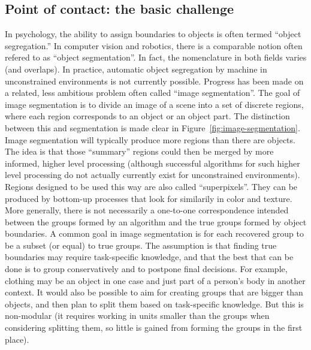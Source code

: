 
\subsection{Point of contact: the basic challenge}

In psychology, the ability to assign boundaries to objects is 
often termed
``object segregation.''  In computer vision and robotics, there
is a comparable notion often refered to as ``object segmentation''.
In fact, the nomenclature in both fields varies (and overlaps).
%
In practice, automatic object segregation by machine
in unconstrained environments is not currently possible.
%
Progress has been made on a related, less ambitious problem
often called ``image segmentation''.  The goal of image segmentation
is to divide an image of a scene into a set of discrete
regions, where each region corresponds to an object or 
an object part.  The distinction between this and 
segmentation is made clear in Figure~\ref{fig:image-segmentation}.
%
Image segmentation will typically produce more regions than there are
objects.  The idea is that those ``summary'' regions could then be
merged by more informed, higher level processing (although successful
algorithms for such higher level processing do not actually currently
exist for unconstrained environments).  Regions designed to be
used this way are also called ``superpixels''.
%
They can be produced by bottom-up processes that look for 
similarily in color and texture.  
%
%
More generally, there is not necessarily a one-to-one
correspondence intended
 between the groups
formed by an algorithm and the true groups formed by object boundaries.
A common
goal in image segmentation is for each recovered group to be a subset (or equal) to
true groups.  The assumption is that finding true boundaries may
require task-specific knowledge, and that the best that can be done is
to group conservatively and to postpone final decisions.  
%
For example, clothing may be an object in
one case and just part of a person's body in another context.
%
\ifverbose
It would also be possible to
aim for creating groups that are bigger than objects, and then
plan to split them based on task-specific knowledge.
But this is  non-modular 
(it requires working in units smaller than the groups when considering 
splitting them, so little is gained from forming the groups in
the first place).
\fi

